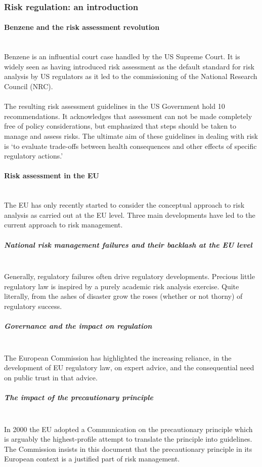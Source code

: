 \documentclass[../summary.tex]{subfiles}
\begin{document}
		\subsubsection{Risk regulation: an introduction}
			\paragraph{Benzene and the risk assessment revolution}\mbox{}\\
				Benzene is an influential court case handled by the US Supreme Court. It is widely seen as having introduced risk assessment as the default standard for risk analysis by US regulators as it led to the commissioning of the National Research Council (NRC). 
				\\\\
				The resulting risk assessment guidelines in the US Government hold 10 recommendations. It acknowledges that assessment can not be made completely free of policy considerations, but emphasized that steps should be taken to manage and assess risks. The ultimate aim of these guidelines in dealing with risk is `to evaluate trade-offs between health consequences and other effects of specific regulatory actions.' 
				
			\paragraph{Risk assessment in the EU}\mbox{}\\
				The EU has only recently started to consider the conceptual approach to risk analysis as carried out at the EU level. Three main developments have led to the current approach to risk management. 
				
				\subparagraph{National risk management failures and their backlash at the EU level}\mbox{}\\
					Generally, regulatory failures often drive regulatory developments. Precious little regulatory law is inspired by a purely academic risk analysis exercise. Quite literally, from the ashes of disaster grow the roses (whether or not thorny) of regulatory success.
				
				\subparagraph{Governance and the impact on regulation}\mbox{}\\
					The European Commission has highlighted the increasing reliance, in the development of EU regulatory law, on expert advice, and the consequential need on public trust in that advice.
					
				\subparagraph{The impact of the precautionary principle}\mbox{}\\
					In 2000 the EU adopted a Communication on the precautionary principle which is arguably the highest-profile attempt to translate the principle into guidelines. The Commission insists in this document that the precautionary principle in its European context is a justified part of risk management.
					\\
					
\end{document}
